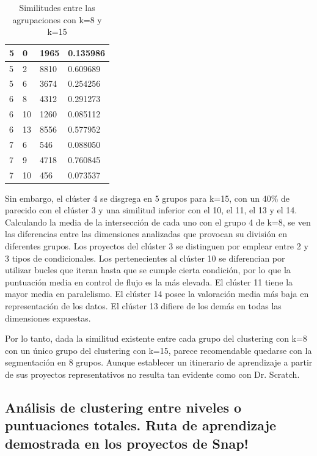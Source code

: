 \documentclass[a4paper, 12pt]{book}
\begin{document}
\begin{table}[H]
{\begin{tabular}{|l|l|l|l|}
        5 & 0 & 1965 & 0.135986 \\ \hline
        \rowcolor[HTML]{CBCEFB} 
        5 & 2 & 8810 & 0.609689 \\ \hline
        5 & 6 & 3674 & 0.254256 \\ \hline\hline
        6 & 8 & 4312 & 0.291273 \\ \hline
        6 & 10 & 1260 & 0.085112 \\ \hline
        \rowcolor[HTML]{CBCEFB} 
        6 & 13 & 8556 & 0.577952 \\ \hline\hline
        7 & 6 & 546 & 0.088050 \\ \hline
        \rowcolor[HTML]{CBCEFB} 
        7 & 9 & 4718 & 0.760845 \\ \hline
        7 & 10 & 456 & 0.073537 \\ \hline
    \end{tabular}}
    \caption{Similitudes entre las agrupaciones con k=8 y k=15}
    \label{table:comparativa_k}
\end{table}

Sin embargo, el clúster 4 se disgrega en 5 grupos para k=15, con un 40\% de parecido con el clúster 3 y una similitud inferior con el 10, el 11, el 13 y el 14. Calculando la media de la intersección de cada uno con el grupo 4 de k=8, se ven las diferencias entre las dimensiones analizadas que provocan su división en diferentes grupos. Los proyectos del clúster 3 se distinguen por emplear entre 2 y 3 tipos de condicionales. Los pertenecientes al clúster 10 se diferencian por utilizar bucles que iteran hasta que se cumple cierta condición, por lo que la puntuación media en control de flujo es la más elevada. El clúster 11 tiene la mayor media en paralelismo. El clúster 14 posee la valoración media más baja en representación de los datos. El clúster 13 difiere de los demás en todas las dimensiones expuestas.

Por lo tanto, dada la similitud existente entre cada grupo del clustering con k=8 con un único grupo del clustering con k=15,  parece recomendable quedarse con la segmentación en 8 grupos. Aunque establecer un itinerario de aprendizaje a partir de sus proyectos representativos no resulta tan evidente como con Dr. Scratch.

\subsection{Análisis de clustering entre niveles o puntuaciones totales. Ruta de aprendizaje demostrada en los proyectos de Snap!}
\label{subsec:ruta_Snap}
\end{document}
